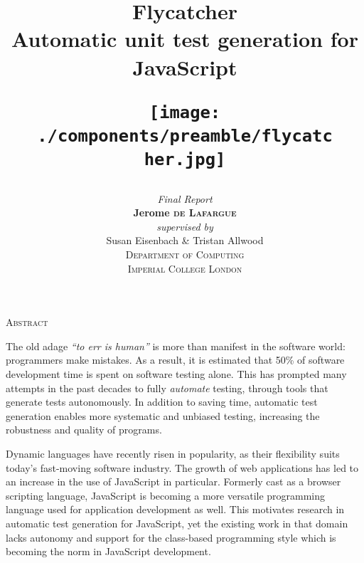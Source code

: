 \title
{
	{\Huge \textsf{Flycatcher} \\[0.2cm]}
	{\large \textsf{Automatic unit test generation for JavaScript}\\[0.5cm]}
	\begin{figure}[h]
		\centering
		\texttt{[image: ./components/preamble/flycatcher.jpg]}
	\end{figure}
}
\author
{	
	{\emph{Final Report}}\\[6.5cm]
	{\large \textbf{Jerome \textsc{de Lafargue}}}\\[0.2cm]
	\emph{supervised by}\\
	Susan Eisenbach \& Tristan Allwood\\[1cm]
	\textsc{\normalsize Department of Computing}\\
	\textsc{\large Imperial College London}
}


\date{}
\pagestyle{empty}
\maketitle


\newpage
\mbox{}

\begin{center}
\textsc{\LARGE Abstract}\\[1.4cm]
\end{center}

The old adage \emph{``to err is human''} is more than manifest in the software world: programmers make mistakes. As a result, it is estimated that 50\% of software development time is spent on software testing alone. This has prompted many attempts in the past decades to fully \emph{automate} testing, through tools that generate tests autonomously. In addition to saving time, automatic test generation enables more systematic and unbiased testing, increasing the robustness and quality of programs.

Dynamic languages have recently risen in popularity, as their flexibility suits today's fast-moving software industry. The growth of web applications has led to an increase in the use of JavaScript in particular. Formerly cast as a browser scripting language, JavaScript is becoming a more versatile programming language used for application development as well. This motivates research in automatic test generation for JavaScript, yet the existing work in that domain \cite{contract-driven,alshraideh2008complete,saxena2010symbolic,artzi2011framework} lacks autonomy and support for the class-based programming style which is becoming the norm in JavaScript development.

